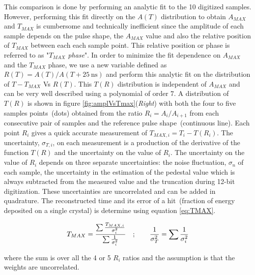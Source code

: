 This comparison is done by performing an analytic fit  to the 10 digitized samples. However, performing this fit directly on the $A(T)$ distribution to obtain $A_{MAX}$ and $T_{MAX}$ is cumbersome and technically inefficient since the amplitude of each sample depends on the pulse shape, the $A_{MAX}$ value and also the relative position of $T_{MAX}$ between each each sample point. This relative position or phase is referred to as "\textit{$T_{MAX}$ phase}". In order to minimize the fit dependence on $A_{MAX}$ and the $T_{MAX}$ phase, we use a new variable defined as $R(T) = A(T)/ A(T + 25~\mbox{ns})$ and perform this analytic fit on the distribution of $T - T_{MAX}$ Vs $ R(T)$. This  $T(R)$ distribution is independent of $A_{MAX}$ and can be very well described using a polynomial of order $7$. A distribution of $T(R)$ is shown in figure \ref{fig:amplVsTmax}(\textit{Right}) with both the four to five samples points~(dots) obtained from the ratio $R_{i} = A_{i}/A_{i+1}$ from each consecutive pair of samples and the reference pulse shape~(continuous line). Each point $R_{i}$ gives a quick accurate measurement of $T_{MAX,i} = T_{i} - T(R_{i})$. The uncertainty, $\sigma_{T,i}$, on each measurement is a production of the derivative of the function $T(R)$ and the uncertainty on the value of $R_{i}$. The uncertainty on the value of $R_{i}$ depends on three separate uncertainties: the noise fluctuation, $\sigma_{n}$ of each sample, the uncertainty in the estimation of the pedestal value which is always subtracted from the measured value and the truncation during 12-bit digitization. These uncertainties are uncorrelated and can be added in quadrature.
The reconstructed time and its error of a hit~(fraction of energy deposited on a single crystal) is determine using equation \ref{eq:TMAX}.


\begin{equation}{\label{eq:TMAX}}
\displaystyle{T_{MAX} = \frac{\sum \frac{T_{MAX,i}}{\sigma^{2}_{i}}}{\sum \frac{1}{\sigma^{2}_{i}}}} \quad ; \quad\quad
\displaystyle{\frac{1}{\sigma^{2}_{T}} =  \sum \frac{1}{\sigma^{2}_{i}} }
\end{equation}

where the sum is over all the 4 or 5 $R_{i}$ ratios and the assumption is that the weights are uncorrelated. 

